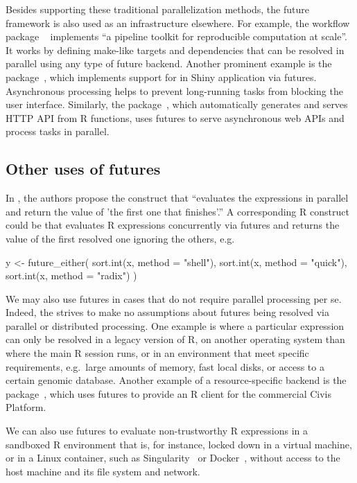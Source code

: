 Besides supporting these traditional parallelization methods, the
future framework is also used as an infrastructure elsewhere.  For
example, the workflow package ~\citep{Landau_2018}
implements ``a pipeline toolkit for reproducible computation at
scale''.  It works by defining make-like targets and dependencies that
can be resolved in parallel using any type of future backend.
Another prominent example is the 
package~\citep{CRAN:shiny}, which implements support
for  in Shiny application via futures.
Asynchronous processing helps to prevent long-running tasks from
blocking the user interface.
Similarly, the  package~\citep{CRAN:plumber}, which
automatically generates and serves HTTP API from R functions, uses
futures to serve asynchronous web APIs and process tasks in parallel.


\subsection{Other uses of futures}
\label{other-usages}

In \citet{HewittBaker_1977}, the authors propose the
 construct that ``evaluates the expressions in
parallel and return the value of 'the first one that finishes'.''  A
corresponding R construct could be  that
evaluates R expressions concurrently via futures and returns the value
of the first resolved one ignoring the others, e.g.
\begin{example}
y <- future_either(
  sort.int(x, method = "shell"),
  sort.int(x, method = "quick"),
  sort.int(x, method = "radix")
)
\end{example}

We may also use futures in cases that do not require parallel
processing per se.  Indeed, the  strives to make no
assumptions about futures being resolved via parallel or distributed
processing.  One example is where a particular expression can only be
resolved in a legacy version of R, on another operating system than
where the main R session runs, or in an environment that meet specific
requirements, e.g.\ large amounts of memory, fast local disks, or
access to a certain genomic database.  Another example of a
resource-specific backend is the 
package~\citep{CRAN:civis}, which uses futures to provide an R client
for the commercial Civis Platform.

We can also use futures to evaluate non-trustworthy R expressions in a
sandboxed R environment that is, for instance, locked down in a
virtual machine, or in a Linux container, such as
Singularity~\citep{Kurtzer2017} or Docker~\citep{Merkel2014}, without
access to the host machine and its file system and network.



